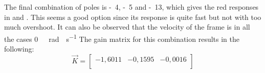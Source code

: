 The final combination of poles is \si{-4}, \si{-5} and \si{-13}, which gives the red responses in  and . This seems a good option since its response is quite fast but not with too much overshoot. It can also be observed that the velocity of the frame is in all the cases \si{0\ rad \cdot s^{-1}} The gain matrix for this combination results in the following:
%
\begin{equation}  \label{controllerSS}
	\vec{K} = 
	\begin{bmatrix}
		-1,6011 & -0,1595 & -0,0016 \\
	\end{bmatrix}
\end{equation}
%